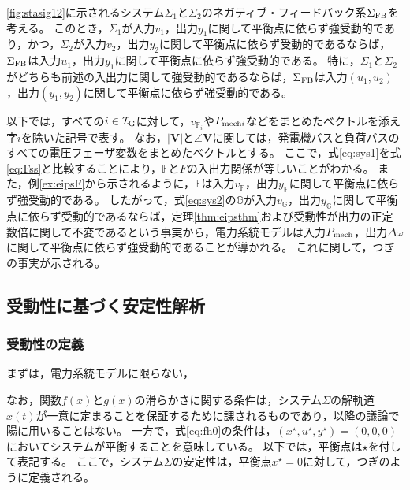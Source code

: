\documentclass[tombow,dvipdfmx]{corona-a5-1.1}
\begin{document}
\begin{定理}[平衡点に依らない受動性に関する受動定理]\label{thm:eipsthm}
\ref{fig:stasig12}に示されるシステム$\Sigma_1$と$\Sigma_2$のネガティブ・フィードバック系$\Sigma_{\rm FB}$を考える。
このとき，$\Sigma_1$が入力$v_1$，出力$y_1$に関して平衡点に依らず強受動的であり，かつ，$\Sigma_2$が入力$v_2$，出力$y_2$に関して平衡点に依らず受動的であるならば，$\Sigma_{\rm FB}$は入力$u_1$，出力$y_1$に関して平衡点に依らず強受動的である。
特に，$\Sigma_1$と$\Sigma_2$がどちらも前述の入出力に関して強受動的であるならば，$\Sigma_{\rm FB}$は入力$(u_1,u_2)$，出力$(y_1,y_2)$に関して平衡点に依らず強受動的である。
\end{定理}





以下では，すべての$i \in \mathcal{I}_{\rm G}$に対して，$v_{{\mathds F}_i}$や$P_{{\rm mech}i}$などをまとめたベクトルを添え字$i$を除いた記号で表す。
なお，$|\bm{V}|$と$\angle \bm{V}$に関しては，発電機バスと負荷バスのすべての電圧フェーザ変数をまとめたベクトルとする。
ここで，式\ref{eq:sys1}を式\ref{eq:Fss}と比較することにより，$\mathds{F}$と$F$の入出力関係が等しいことがわかる。
また，例\ref{ex:eipsF}から示されるように，$\mathds{F}$は入力$v_{\mathds F}$，出力$y_{\mathds F}$に関して平衡点に依らず強受動的である。
したがって，式\ref{eq:sys2}の$\mathds{G}$が入力$v_{\mathds G}$，出力$y_{\mathds G}$に関して平衡点に依らず受動的であるならば，定理\ref{thm:eipsthm}および受動性が出力の正定数倍に関して不変であるという事実から，電力系統モデルは入力$P_{\rm mech}$，出力$\Delta \omega$に関して平衡点に依らず強受動的であることが導かれる。
これに関して，つぎの事実が示される。






\subsection{受動性に基づく安定性解析\advanced}\label{sec:passstab}

\subsubsection{受動性の定義}

まずは，電力系統モデルに限らない，



なお，関数$f(x)$と$g(x)$の滑らかさに関する条件は，システム$\Sigma$の解軌道$x(t)$が一意に定まることを保証するために課されるものであり，以降の議論で陽に用いることはない。
一方で，式\ref{eq:fh0}の条件は，$(x^{\star},u^{\star},y^{\star})=(0,0,0)$においてシステムが平衡することを意味している。
以下では，平衡点は$\star$を付して表記する。
ここで，システム$\Sigma$の安定性は，平衡点$x^{\star}=0$に対して，つぎのように定義される。
\end{document}
